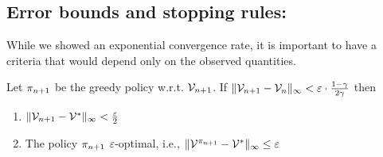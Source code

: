 \subsection{Error bounds and stopping rules:}

While we showed an exponential convergence rate, it is important to
have a criteria that would depend only on the observed quantities.
\begin{lemma}
Let $\pi_{n+1}$ be the greedy policy w.r.t. $\mathcal{V}_{n+1}$. If $\|\mathcal{V}_{n+1}-\mathcal{V}_{n}\|_\infty < \varepsilon \cdot \frac{1-\gamma}{2\gamma}$ then
\begin{enumerate}
    \item $\|\mathcal{V}_{n+1} - \mathcal{V}^{*}\|_\infty < \frac{\varepsilon}{2}$
    \item The policy $\pi_{n+1}$ $\varepsilon$-optimal, i.e., $\|\mathcal{V}^{\pi_{n+1}}-\mathcal{V}^*\|_\infty\leq \varepsilon$
\end{enumerate}
\end{lemma}

